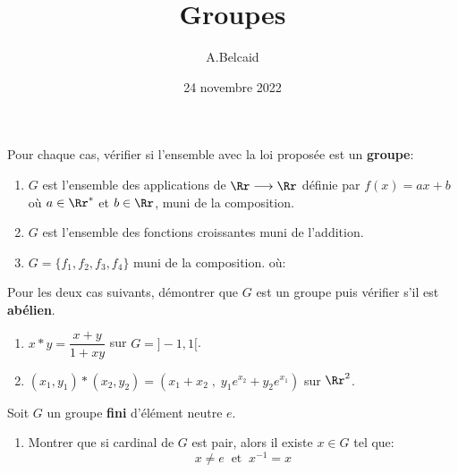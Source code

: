 \documentclass[10pt, a4paper, twocolumn]{homework}
\title{Groupes}
\date{24 novembre 2022}
\author{A.Belcaid}
\begin{document}
\maketitle


Pour chaque cas, vérifier si l'ensemble avec la loi proposée est un
\textbf{groupe}:

\begin{enumerate}
  \item $G$ est l'ensemble des applications de $\Rr\longrightarrow\Rr$ définie
    par $f(x) = ax + b$ où $a\in \Rr^{*}$ et $b\in \Rr$, muni de la composition.

  \item $G$ est l'ensemble des fonctions croissantes muni de l'addition.
  \item $G = \{f_1, f_2, f_3, f_4\}$ muni de la composition.
    où:\\
\end{enumerate}
Pour les deux cas suivants, démontrer que $G$ est un groupe puis vérifier s'il
est \textbf{abélien}.

\begin{enumerate}
  \item $x * y = \dfrac{x+y}{1 + xy}$ sur $G= ]-1,1[$.\\[2pt]
  \item $(x_1,y_1)*(x_2,y_2) = (x_1+x_2\;,\; y_1e^{x_2} + y_2e^{x_1})$ sur
    $\Rr^2$.\\[8pt] 
\end{enumerate}

Soit $G$ un groupe \textbf{fini} d'élément neutre $e$.\\
\begin{enumerate}
  \item 
Montrer que si cardinal de $G$ est pair, alors il existe $x\in G$ tel que:
$$x\neq
e\;\;\text{et}\;\; x^{-1} = x$$
\end{enumerate}
\end{document}
